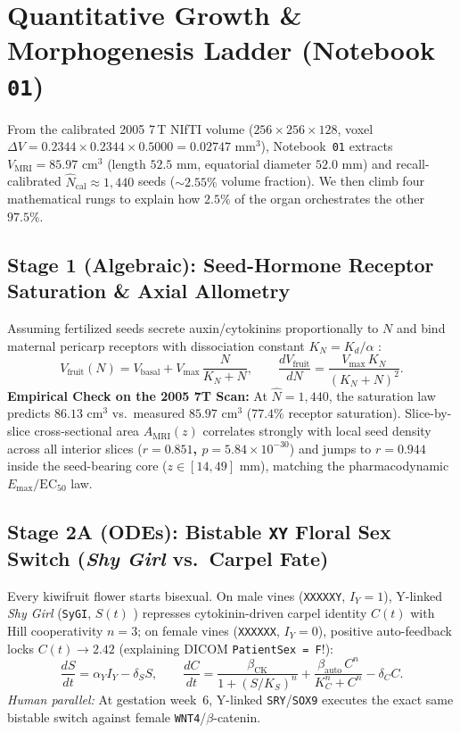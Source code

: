 \documentclass[10.5pt,a4paper]{article}
\begin{document}
\section{Quantitative Growth \& Morphogenesis Ladder (Notebook \texttt{01})}
\label{sec:morphogenesis}

From the calibrated 2005 7\,T NIfTI volume ($256\times 256\times 128$, voxel $\Delta V = 0.2344\times 0.2344\times 0.5000 = 0.02747\text{ mm}^3$), Notebook~\texttt{01} extracts $V_{\text{MRI}} = 85.97\text{ cm}^3$ (length $52.5\text{ mm}$, equatorial diameter $52.0\text{ mm}$) and recall-calibrated $\widehat{N}_{\text{cal}} \approx 1{,}440$ seeds ($\sim 2.55\%$ volume fraction). We then climb four mathematical rungs to explain how $2.5\%$ of the organ orchestrates the other $97.5\%$.

\subsection{Stage 1 (Algebraic): Seed-Hormone Receptor Saturation \& Axial Allometry}

Assuming fertilized seeds secrete auxin/cytokinins proportionally to $N$ and bind maternal pericarp receptors with dissociation constant $K_N = K_d/\alpha$ \cite{pyke1986}:
\begin{equation}
    V_{\text{fruit}}(N) = V_{\text{basal}} + V_{\max}\,\frac{N}{K_N + N}, \qquad \frac{dV_{\text{fruit}}}{dN} = \frac{V_{\max}\,K_N}{(K_N + N)^2}.
\end{equation}
\textbf{Empirical Check on the 2005 7T Scan:} At $\widehat{N}=1{,}440$, the saturation law predicts \textbf{$86.13\text{ cm}^3$} vs.\ measured \textbf{$85.97\text{ cm}^3$} ($77.4\%$ receptor saturation). Slice-by-slice cross-sectional area $A_{\text{MRI}}(z)$ correlates strongly with local seed density across all interior slices (\textbf{$r = 0.851$, $p = 5.84\times 10^{-30}$}) and jumps to \textbf{$r = 0.944$} inside the seed-bearing core ($z \in [14, 49]\text{ mm}$), matching the pharmacodynamic $E_{\max}/\text{EC}_{50}$ law.

\subsection{Stage 2A (ODEs): Bistable \texttt{XY} Floral Sex Switch (\emph{Shy Girl} vs.\ Carpel Fate)}

Every kiwifruit flower starts bisexual. On male vines (\texttt{XXXXXY}, $I_Y = 1$), Y-linked \emph{Shy Girl} (\texttt{SyGI}, $S(t)$ \cite{akagi2018}) represses cytokinin-driven carpel identity $C(t)$ with Hill cooperativity $n=3$; on female vines (\texttt{XXXXXX}, $I_Y = 0$), positive auto-feedback locks $C(t) \to 2.42$ (explaining DICOM \texttt{PatientSex = F}!):
\begin{equation}
    \frac{dS}{dt} = \alpha_Y I_Y - \delta_S S, \qquad \frac{dC}{dt} = \frac{\beta_{\text{CK}}}{1 + (S/K_S)^n} + \frac{\beta_{\text{auto}}\,C^n}{K_C^n + C^n} - \delta_C C.
\end{equation}
\emph{Human parallel:} At gestation week~6, Y-linked \texttt{SRY}/\texttt{SOX9} executes the exact same bistable switch against female \texttt{WNT4}/$\beta$-catenin.
\end{document}

